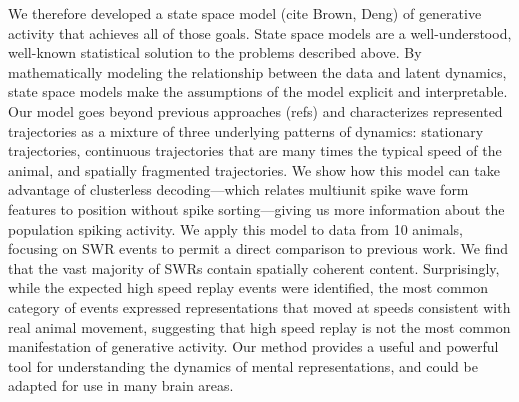 \documentclass[times, twoside]{zHenriquesLab-StyleBioRxiv}
\begin{document}
We therefore developed a state space model (cite Brown, Deng) of generative activity that achieves all of those goals. State space models are a well-understood, well-known statistical solution to the problems described above. By mathematically modeling the relationship between the data and latent dynamics, state space models make the assumptions of the model explicit and interpretable. Our model goes beyond previous approaches (refs) and characterizes represented trajectories as a mixture of three underlying patterns of dynamics: stationary trajectories, continuous trajectories that are many times the typical speed of the animal, and spatially fragmented trajectories. We show how this model can take advantage of clusterless decoding---which relates multiunit spike wave form features to position without spike sorting---giving us more information about the population spiking activity. We apply this model to data from 10 animals, focusing on SWR events to permit a direct comparison to previous work. We find that the vast majority of SWRs contain spatially coherent content. Surprisingly, while the expected high speed replay events were identified, the most common category of events expressed representations that moved at speeds consistent with real animal movement, suggesting that high speed replay is not the most common manifestation of generative activity. Our method provides a useful and powerful tool for understanding the dynamics of mental representations, and could be adapted for use in many brain areas. 
\end{document}
